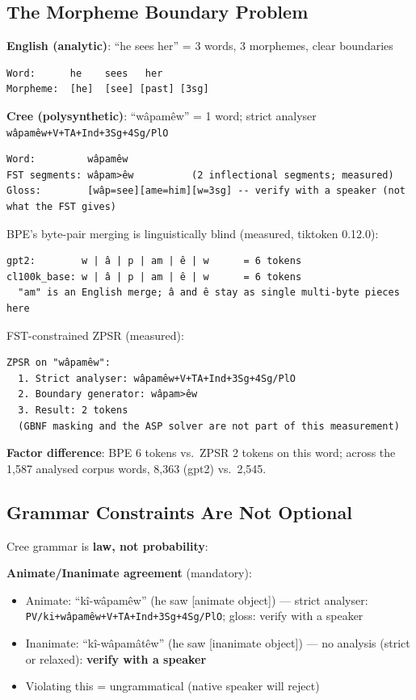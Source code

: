 \documentclass[11pt,oneside]{article}
\begin{document}
\subsection{The Morpheme Boundary Problem}

\textbf{English (analytic)}: ``he sees her'' = 3 words, 3 morphemes, clear boundaries

\begin{lstlisting}
Word:      he    sees   her
Morpheme:  [he]  [see] [past] [3sg]
\end{lstlisting}

\textbf{Cree (polysynthetic)}: ``wâpamêw'' = 1 word; strict analyser \texttt{wâpamêw+V+TA+Ind+3Sg+4Sg/PlO}

\begin{lstlisting}
Word:         wâpamêw
FST segments: wâpam>êw          (2 inflectional segments; measured)
Gloss:        [wâp=see][ame=him][w=3sg] -- verify with a speaker (not what the FST gives)
\end{lstlisting}

BPE's byte-pair merging is linguistically blind (measured, tiktoken 0.12.0):

\begin{lstlisting}
gpt2:        w | â | p | am | ê | w      = 6 tokens
cl100k_base: w | â | p | am | ê | w      = 6 tokens
  "am" is an English merge; â and ê stay as single multi-byte pieces here
\end{lstlisting}

FST-constrained ZPSR (measured):

\begin{lstlisting}
ZPSR on "wâpamêw":
  1. Strict analyser: wâpamêw+V+TA+Ind+3Sg+4Sg/PlO
  2. Boundary generator: wâpam>êw
  3. Result: 2 tokens
  (GBNF masking and the ASP solver are not part of this measurement)
\end{lstlisting}

\textbf{Factor difference}: BPE 6 tokens vs.\ ZPSR 2 tokens on this word; across the 1,587 analysed corpus words, 8,363 (gpt2) vs.\ 2,545.

\subsection{Grammar Constraints Are Not Optional}

Cree grammar is \textbf{law, not probability}:

\textbf{Animate/Inanimate agreement} (mandatory):
\begin{itemize}
  \item Animate: ``kî-wâpamêw'' (he saw [animate object]) --- strict analyser: \texttt{PV/ki+wâpamêw+V+TA+Ind+3Sg+4Sg/PlO}; gloss: verify with a speaker
  \item Inanimate: ``kî-wâpamâtêw'' (he saw [inanimate object]) --- no analysis (strict or relaxed): \textbf{verify with a speaker}
  \item Violating this = ungrammatical (native speaker will reject)
\end{itemize}
\end{document}
